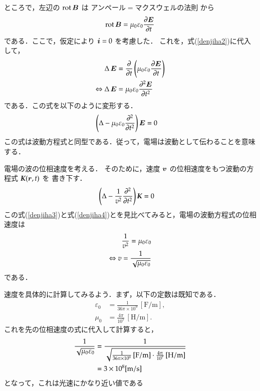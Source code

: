             ところで，左辺の $\mathrm{rot}\,\boldsymbol{B}$ は アンペール$=$マクスウェルの法則 から
            \begin{align*}
                \mathrm{rot}\,\boldsymbol{B} = \mu_{0}\varepsilon_{0}
                \frac{\partial \boldsymbol{E}}{\partial t}
            \end{align*}
            である．ここで，仮定により $\boldsymbol{i}=0$ を考慮した．
            これを，式(\ref{denjiha2})に代入して，
            \begin{align}
                \Delta\,\boldsymbol{E} &=
                \frac{\partial }{\partial t}\left(\mu_{0}\varepsilon_{0}
                \frac{\partial \boldsymbol{E}}{\partial t}\right)\notag \\
                \Leftrightarrow
                \Delta\,\boldsymbol{E}
                &=
                \mu_{0}\varepsilon_{0}
                \frac{\partial^{2} \boldsymbol{E}}{\partial t^{2}}
            \end{align}
            である．この式を以下のように変形する．
            \begin{align}\label{denjiha3}
                \left(\Delta-\mu_{0}\varepsilon_{0}
                \frac{\rd^{2}}{\rd t^{2}}\right)\bE
                &=0
            \end{align}
            この式は波動方程式と同型である．従って，電場は波動として伝わることを意味する．

            電場の波の位相速度を考える．
            そのために，速度 $\boldsymbol{v}$ の位相速度をもつ波動の方程式 $\textit{\textbf{K}}(\boldsymbol{r},t)$ を
            書き下す．
            \begin{align}\label{denjiha4}
                \left(\Delta-\frac{1}{v^{2}}
                \frac{\rd^{2}}{\rd t^{2}}\right)\textit{\textbf{K}}
                &=0
            \end{align}
            この式(\ref{denjiha3})と式(\ref{denjiha4})とを見比べてみると，電場の波動方程式の位相速度は
            \begin{align}
                \frac{1}{v^{2}}=\mu_{0}\varepsilon_{0} \notag \\
                \Leftrightarrow
                v=\frac{1}{\sqrt{\mu_{0}\varepsilon_{0}}}
            \end{align}
            である．

            速度を具体的に計算してみるよう．まず，以下の定数は既知である．
            \begin{align*}
                \varepsilon_{0} &= \frac{1}{36\pi\times 10^{9}}\, \mathrm{[F/m]}, \\
                \mu_{0}         &= \frac{4\pi}{ 10^{7}}\, \mathrm{[H/m]}.
            \end{align*}
            これを先の位相速度の式に代入して計算すると，
            \begin{align}
                \frac{1}{\sqrt{\mu_{0}\varepsilon_{0}}}
                &= \frac{1}{\sqrt{\frac{1}{36\pi\times 10^{9}}\,\mathrm{[F/m]} \cdot \frac{4\pi}{ 10^{7}}\,\mathrm{[H/m]}}} \notag \\
                &= 3\times 10^{8} \mathrm{[m/s]}
            \end{align}
            となって，これは光速にかなり近い値である

